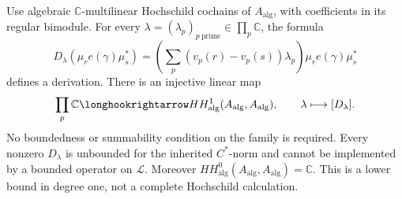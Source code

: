 \begin{theorem}
\label{v4-arith:thm:CM-HH-BC}
Use algebraic \(\mathbb C\)-multilinear Hochschild cochains of
\(A_{\mathrm{alg}}\), with coefficients in its regular bimodule.
For every \(\lambda=(\lambda_p)_{p\ \mathrm{prime}}
\in\prod_p\mathbb C\), the formula
\[
 D_\lambda(\mu_r e(\gamma)\mu_s^*)
 =\left(\sum_p(v_p(r)-v_p(s))\lambda_p\right)
       \mu_r e(\gamma)\mu_s^*
\]
defines a derivation. There is an injective linear map
\[
 \prod_p\mathbb C\longhookrightarrow
 HH^1_{\mathrm{alg}}(A_{\mathrm{alg}},A_{\mathrm{alg}}),
 \qquad \lambda\longmapsto[D_\lambda].
\]
No boundedness or summability condition on the family is required.
Every nonzero \(D_\lambda\) is unbounded for the inherited
\(C^*\)-norm and cannot be implemented by a bounded operator on
\(\mathcal L\). Moreover
\(HH^0_{\mathrm{alg}}(A_{\mathrm{alg}},A_{\mathrm{alg}})=\mathbb C\).
This is a lower bound in degree one, not a complete Hochschild calculation.
\end{theorem}
